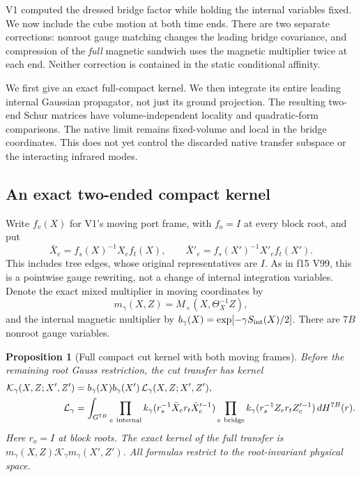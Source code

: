 \documentclass[11pt,oneside]{article}
\newtheorem{proposition}[theorem]{Proposition}
\begin{document}
V1 computed the dressed bridge factor while holding the internal
variables fixed. We now include the cube motion at both time ends.
There are two separate corrections: nonroot gauge matching changes
the leading bridge covariance, and compression of the \emph{full}
magnetic sandwich uses the magnetic multiplier twice at each end.
Neither correction is contained in the static conditional affinity.

We first give an exact full-compact kernel. We then integrate its
entire leading internal Gaussian propagator, not just its ground
projection. The resulting two-end Schur matrices have
volume-independent locality and quadratic-form comparisons.
The native limit remains fixed-volume and local in the bridge
coordinates. This does not yet control the discarded native
transfer subspace or the interacting infrared modes.

\subsection{An exact two-ended compact kernel}

Write \(f_v(X)\) for V1's moving port frame, with \(f_o=I\) at
every block root, and put
\[
 \bar X_e=f_s(X)^{-1}X_ef_t(X),\qquad
 \bar X'_e=f_s(X')^{-1}X'_ef_t(X').
\]
This includes tree edges, whose original representatives are \(I\).
As in f15 V99, this is a pointwise gauge rewriting, not a change
of internal integration variables. Denote the exact mixed
multiplier in moving coordinates by
\[
 m_\gamma(X,Z)=M_\times(X,\Theta_X^{-1}Z),
\]
and the internal magnetic multiplier by
\(b_\gamma(X)=\exp[-\gamma S_{\rm int}(X)/2]\).
There are \(7B\) nonroot gauge variables.

\begin{proposition}[Full compact cut kernel with both moving frames]
\label{f16v2:exact-cut}
Before the remaining root Gauss restriction, the cut transfer has
kernel
\begin{align}
 \mathcal K_\gamma(X,Z;X',Z')
 &=b_\gamma(X)b_\gamma(X')\,\mathcal L_\gamma(X,Z;X',Z'),
 \notag\\
 \mathcal L_\gamma
 &=\int_{G^{7B}}
   \prod_{e\ {\rm internal}}
       k_\gamma(r_s^{-1}\bar X_e r_t\bar X_e'^{-1})
   \prod_{e\ {\rm bridge}}
       k_\gamma(r_s^{-1}Z_e r_t Z_e'^{-1})\,dH^{7B}(r).
 \label{f16v2:cut}
\end{align}
Here \(r_o=I\) at block roots. The exact kernel of the full
transfer is \(m_\gamma(X,Z)\mathcal K_\gamma
m_\gamma(X',Z')\). All formulas restrict to the root-invariant
physical space.
\end{proposition}
\end{document}
